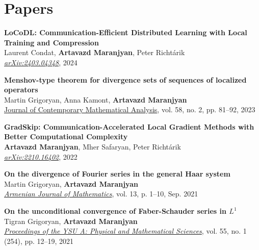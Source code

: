 \documentclass[11pt,a4paper,sans]{moderncv}        %
\begin{document}
\section{Papers}
\begin{etaremune}

\item \textbf{LoCoDL: Communication-Efficient Distributed Learning with Local Training and Compression}\\
Laurent Condat, \textbf{Artavazd Maranjyan}, Peter Richtárik\\
\textcolor{accent}{\href{https://arxiv.org/abs/2403.04348}{\textit{arXiv:2403.04348}}}, 2024

\vspace{2mm}

\item \textbf{Menshov-type theorem for divergence sets of sequences of localized operators}\\
Martin Grigoryan, Anna Kamont, \textbf{Artavazd Maranjyan}\\
\href{https://doi.org/10.3103/S106836232302005X}{Journal of Contemporary Mathematical Analysis}, vol. 58, no. 2, pp. 81–92, 2023

\vspace{2mm}

\item \textbf{GradSkip: Communication-Accelerated Local Gradient Methods with Better Computational Complexity}\\
\textbf{Artavazd Maranjyan}, Mher Safaryan, Peter Richtárik\\
\textcolor{accent}{\href{https://arxiv.org/abs/2210.16402}{\textit{arXiv:2210.16402}}}, 2022

\vspace{2mm}

\item \textbf{On the divergence of Fourier series in the general Haar system}\\
Martin Grigoryan, \textbf{Artavazd Maranjyan}\\ \textcolor{accent}{\href{https://doi.org/10.52737/18291163-2021.13.6-1-10}{\textit{Armenian Journal of Mathematics}}}, vol. 13, p. 1–10, Sep. 2021

\vspace{2mm}

\item \textbf{On the unconditional convergence of Faber-Schauder series in $L^1$}\\
Tigran Grigoryan, \textbf{Artavazd Maranjyan}\\
\textcolor{accent}{\href{http://www.old.ysu.am/files/vol55\_no1\_2021\_pp12\%E2\%80\%9319.pdf}{\textit{Proceedings of the YSU A: Physical and Mathematical Sciences}}}, vol. 55, no. 1 (254), pp. 12–19, 2021
\end{etaremune}
\end{document}
